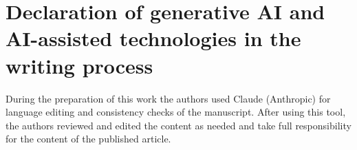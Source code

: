 \documentclass{elsarticle}
\begin{document}
\section*{Declaration of generative AI and AI-assisted technologies in the writing process}
During the preparation of this work the authors used Claude (Anthropic) for language editing and consistency checks of the manuscript. After using this tool, the authors reviewed and edited the content as needed and take full responsibility for the content of the published article.







\appendix


\end{document}
